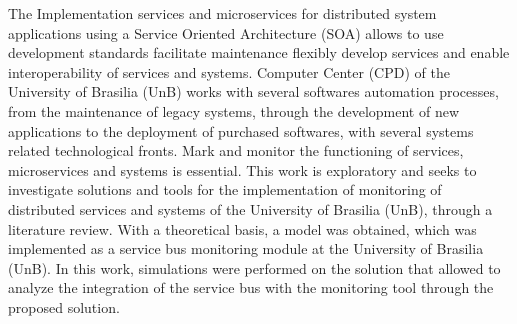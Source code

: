 The Implementation services and microservices for distributed system applications using a Service Oriented Architecture (SOA) allows to use development standards facilitate maintenance flexibly develop services and enable interoperability of services and systems. Computer Center (CPD) of the University of Brasilia (UnB) works with several softwares automation processes, from the maintenance of legacy systems, through the development of new applications to the deployment of purchased softwares, with several systems related technological fronts. Mark and monitor the functioning of services, microservices and systems is essential. This work is exploratory and seeks to investigate solutions and tools for the implementation of monitoring of distributed services and systems of the University of Brasilia (UnB), through a literature review. With a theoretical basis, a model was obtained, which was implemented as a service bus monitoring module at the University of Brasilia (UnB). In this work, simulations were performed on the solution that allowed to analyze the integration of the service bus with the monitoring tool through the proposed solution.